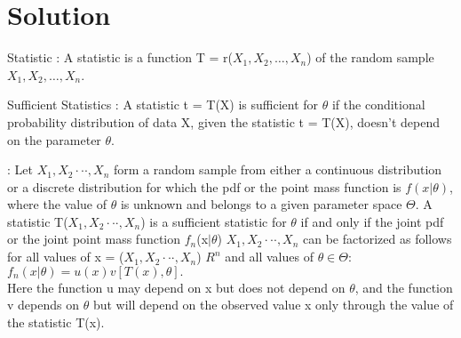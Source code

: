 \documentclass[journal,12pt,twocolumn]{IEEEtran}
\begin{document}
\section{Solution} 
\begin{definition}
     Statistic : A statistic is a function T = r($X_{1},X_{2},\dots,X_{n}$) of the random sample $X_{1},X_{2},\dots,X_{n}$.
   \end{definition}
   \begin{definition}
    Sufficient Statistics : A statistic t = T(X) is sufficient for $\theta$ if the conditional probability distribution of data X, given the statistic t = T(X), doesn't depend on the parameter $\theta$.
   \end{definition}
   \begin{theorem}\label{1}
    : Let $X_{1},X_{2} · · · , X_{n}$ form a random sample from either a continuous
distribution or a discrete distribution for which the pdf or the point mass function is $f(x\vert\theta)$,
where the value of $\theta$ is unknown and belongs to a given parameter space $\Theta$. A statistic
T($X_{1},X_{2} · · · , X_{n}$) is a sufficient statistic for $\theta$ if and only if the joint pdf or the joint point mass
function $f_{n}$(x$\vert\theta$) $X_{1},X_{2} · · · , X_{n}$ can be factorized as follows for all values of x = ($X_{1},X_{2} · · · , X_{n}$) \to
$R^{n}$ and all values of $\theta \in \Theta$:
$f_{n}(x\vert \theta) = u(x)v[T(x), \theta].$\\
Here the function u may depend on x but does not
depend on $\theta$, and the function v depends on $\theta$ but will depend on the observed value x only through the value of the statistic T(x).
   \end{theorem}
\end{document}
